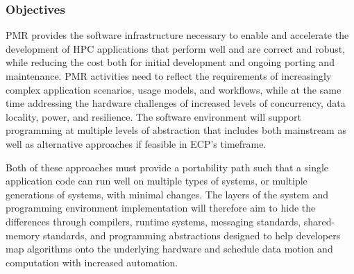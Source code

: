 \subsubsection{Objectives}
PMR provides the software infrastructure necessary to enable and accelerate the development of HPC applications that perform well and are correct and robust, while reducing the cost both for initial development and ongoing porting and maintenance. PMR activities need to reflect the requirements of increasingly complex application scenarios, usage models, and workflows, while at the same time addressing the hardware challenges of increased levels of concurrency, data locality, power, and resilience. The software environment will support programming at multiple levels of abstraction that includes both mainstream as well as alternative approaches if feasible in ECP’s timeframe. 

Both of these approaches must provide a portability path such that a single application code can run well on multiple types of systems, or multiple generations of systems, with minimal changes. The layers of the system and programming environment implementation will therefore aim to hide the differences through compilers, runtime systems, messaging standards, shared-memory standards, and programming abstractions designed to help developers map algorithms onto the underlying hardware and schedule data motion and computation with increased automation.
